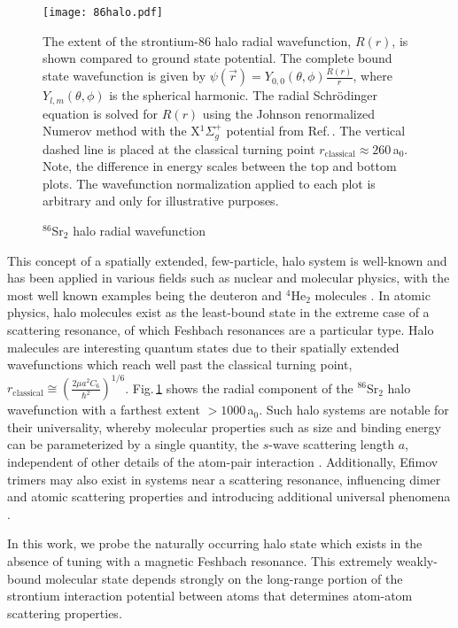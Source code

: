 	\begin{figure}
		\centerline{
		\texttt{[image: 86halo.pdf]}}
		\caption{$^{86}$Sr$_2$ halo radial wavefunction}{The extent of the strontium-86 halo radial wavefunction, $R(r)$, is shown compared to ground state potential. The complete bound state wavefunction is given by $\psi(\vec{r})=Y_{0,0}(\theta,\phi)\frac{R(r)}{r}$, where $Y_{l,m}(\theta,\phi)$ is the spherical harmonic. The radial Schr\"{o}dinger equation is solved for $R(r)$ using the Johnson renormalized Numerov method \cite{Gibson2016, Johnson1978} with the X$^1\Sigma_g^+$ potential from Ref.\,\cite{Stein2010}. The vertical dashed line is placed at the classical turning point $r_\text{classical} \approx 260$\,a$_0$. Note, the difference in energy scales between the top and bottom plots. The wavefunction normalization applied to each plot is arbitrary and only for illustrative purposes.}
		\label{fig:86halo}
	\end{figure} 
This concept of a spatially extended, few-particle, halo system is well-known and has been applied in various fields such as nuclear and molecular physics, with the most well known examples being the deuteron and $^4$He$_2$ molecules \cite{lmk93,sto94,Kohler2006}.
In atomic physics, halo molecules exist as the least-bound state in the extreme case of a scattering resonance, of which Feshbach resonances are a particular type.
Halo malecules are interesting quantum states due to their spatially extended wavefunctions which reach well past the classical turning point, $r_\text{classical} \cong \left( \frac{2 \mu a^2 C_6}{\hbar^2} \right)^{1/6}$.
Fig.\,\ref{fig:86halo} shows the radial component of the $^{86}$Sr$_2$ halo wavefunction with a farthest extent $>\!1000$\,a$_0$.
Such halo systems are notable for their universality, whereby molecular properties such as size and binding energy can be parameterized by a single quantity, the $s$-wave scattering length $a$, independent of other details of the atom-pair interaction \cite{Kohler2006,bha06}. 
Additionally, Efimov trimers may also exist in systems near a scattering resonance, influencing dimer and atomic scattering properties and introducing additional universal phenomena \cite{bha07,nen17}.

In this work, we probe the naturally occurring halo state which exists in the absence of tuning with a magnetic Feshbach resonance. 
This extremely weakly-bound molecular state depends strongly on the long-range portion of the strontium interaction potential between atoms that determines atom-atom scattering properties.

